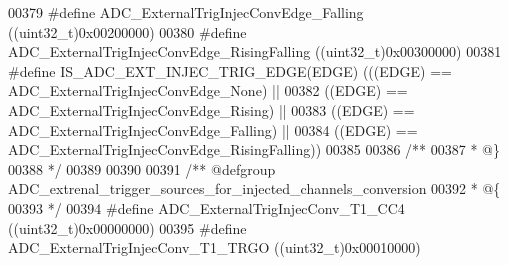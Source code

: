 \begin{DoxyCode}
00379 \textcolor{preprocessor}{#}\textcolor{preprocessor}{define} \textcolor{preprocessor}{ADC\_ExternalTrigInjecConvEdge\_Falling}       \textcolor{preprocessor}{(}\textcolor{preprocessor}{(}\textcolor{preprocessor}{uint32\_t}\textcolor{preprocessor}{)}0x00200000\textcolor{preprocessor}{)}
00380 \textcolor{preprocessor}{#}\textcolor{preprocessor}{define} \textcolor{preprocessor}{ADC\_ExternalTrigInjecConvEdge\_RisingFalling} \textcolor{preprocessor}{(}\textcolor{preprocessor}{(}\textcolor{preprocessor}{uint32\_t}\textcolor{preprocessor}{)}0x00300000\textcolor{preprocessor}{)}
00381 \textcolor{preprocessor}{#}\textcolor{preprocessor}{define} \textcolor{preprocessor}{IS\_ADC\_EXT\_INJEC\_TRIG\_EDGE}\textcolor{preprocessor}{(}\textcolor{preprocessor}{EDGE}\textcolor{preprocessor}{)} \textcolor{preprocessor}{(}\textcolor{preprocessor}{(}\textcolor{preprocessor}{(}\textcolor{preprocessor}{EDGE}\textcolor{preprocessor}{)} \textcolor{preprocessor}{==} 
      ADC_ExternalTrigInjecConvEdge_None\textcolor{preprocessor}{)} \textcolor{preprocessor}{||}
00382                                           \textcolor{preprocessor}{(}\textcolor{preprocessor}{(}\textcolor{preprocessor}{EDGE}\textcolor{preprocessor}{)} \textcolor{preprocessor}{==} 
      ADC_ExternalTrigInjecConvEdge_Rising\textcolor{preprocessor}{)} \textcolor{preprocessor}{||}
00383                                           \textcolor{preprocessor}{(}\textcolor{preprocessor}{(}\textcolor{preprocessor}{EDGE}\textcolor{preprocessor}{)} \textcolor{preprocessor}{==} 
      ADC_ExternalTrigInjecConvEdge_Falling\textcolor{preprocessor}{)} \textcolor{preprocessor}{||}
00384                                           \textcolor{preprocessor}{(}\textcolor{preprocessor}{(}\textcolor{preprocessor}{EDGE}\textcolor{preprocessor}{)} \textcolor{preprocessor}{==} 
      ADC_ExternalTrigInjecConvEdge_RisingFalling\textcolor{preprocessor}{)}\textcolor{preprocessor}{)}
00385 
00386 \textcolor{comment}{/**}
00387 \textcolor{comment}{  * @\}}
00388 \textcolor{comment}{  */}
00389 
00390 
00391 \textcolor{comment}{/** @defgroup ADC\_extrenal\_trigger\_sources\_for\_injected\_channels\_conversion }
00392 \textcolor{comment}{  * @\{}
00393 \textcolor{comment}{  */}
00394 \textcolor{preprocessor}{#}\textcolor{preprocessor}{define} \textcolor{preprocessor}{ADC\_ExternalTrigInjecConv\_T1\_CC4}            \textcolor{preprocessor}{(}\textcolor{preprocessor}{(}\textcolor{preprocessor}{uint32\_t}\textcolor{preprocessor}{)}0x00000000\textcolor{preprocessor}{)}
00395 \textcolor{preprocessor}{#}\textcolor{preprocessor}{define} \textcolor{preprocessor}{ADC\_ExternalTrigInjecConv\_T1\_TRGO}           \textcolor{preprocessor}{(}\textcolor{preprocessor}{(}\textcolor{preprocessor}{uint32\_t}\textcolor{preprocessor}{)}0x00010000\textcolor{preprocessor}{)}

\end{DoxyCode}
